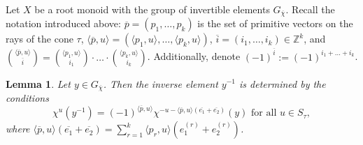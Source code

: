 \documentclass[a4paper, 11pt]{amsart}
\theoremstyle{plain}
\newtheorem{lemma}[theorem]{Lemma}
\theoremstyle{remark}
\theoremstyle{definition}
\newcommand{\ZZ}{\mathbb{Z}}
\newcommand{\GG}{G_{\overline{\chi}}}
\newcommand{\ol}[1]{\overline{#1}}
\begin{document}
Let $X$ be a root monoid with the group of invertible elements $\GG$. Recall the notation introduced above: $\ol{p} = (p_1, \ldots, p_k)$ is the set of primitive vectors on the rays of the cone $\tau$, $\langle \ol{p}, u \rangle = (\langle p_1, u \rangle, \ldots, \langle p_k, u \rangle)$, $\ol{i} = (i_1, \ldots, i_k) \in \ZZ^k$, and ${ \langle \ol{p}, u \rangle \choose \ol{i} }  =  { \langle p_1, u \rangle \choose i_1} \cdot \ldots \cdot  { \langle p_k, u \rangle \choose i_k}$. Additionally, denote $(-1)^{\ol{i}} := (-1)^{i_1 + \ldots + i_k}$.

\begin{lemma}
Let $y \in \GG$. Then the inverse element $y^{-1}$ is determined by the conditions
\begin{equation}\label{eq_inv}
\chi^u(y^{-1}) = (-1)^{\langle \ol{p},u\rangle}
\chi^{-u - \langle \ol{p}, u \rangle (\ol{e_1} + \ol{e_2})}(y) \text{ for all } u\in S_\tau,
\end{equation}
where $\langle \ol{p}, u \rangle (\ol{e_1} + \ol{e_2}) = \sum \limits_{r = 1}^{k} \langle p_r, u \rangle (e_1^{(r)} + e_2^{(r)})$.
\end{lemma}
\end{document}
